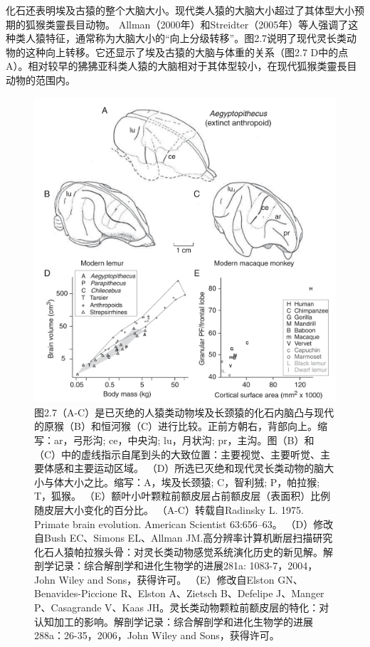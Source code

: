 化石还表明埃及古猿的整个大脑大小。现代类人猿的大脑大小超过了其体型大小预期的狐猴类靈長目动物。 Allman（2000年）和Streidter（2005年）等人强调了这种类人猿特征，通常称为大脑大小的“向上分级转移”。图2.7说明了现代灵长类动物的这种向上转移。它还显示了埃及古猿的大脑与体重的关系（图2.7 D中的点A）。相对较早的狒狒亚科类人猿的大脑相对于其体型较小，在现代狐猴类靈長目动物的范围内。

\begin{figure}[!htb]
	\centering
	\includegraphics[width=0.8\linewidth]{image_pfc/Fig_2_7}
	\caption*{图2.7（A-C）是已灭绝的人猿类动物埃及长颈猿的化石内脑凸与现代的原猴（B）和恒河猴（C）进行比较。正前方朝右，背部向上。缩写：ar，弓形沟; ce，中央沟; lu，月状沟; pr，主沟。图（B）和（C）中的虚线指示自尾到头的大致位置：主要视觉、主要听觉、主要体感和主要运动区域。 （D）所选已灭绝和现代灵长类动物的脑大小与体大小之比。缩写：A，埃及长颈猿; C，智利狨; P，帕拉猴; T，狐猴。 （E）额叶小叶颗粒前额皮层占前额皮层（表面积）比例随皮层大小变化的百分比。 （A-C）转载自Radinsky L. 1975. Primate brain evolution. American Scientist 63:656–63。 （D）修改自Bush EC、Simons EL、Allman JM.高分辨率计算机断层扫描研究化石人猿帕拉猴头骨：对灵长类动物感觉系统演化历史的新见解。解剖学记录：综合解剖学和进化生物学的进展281a: 1083-7，2004，John Wiley and Sons，获得许可。 （E）修改自Elston GN、Benavides-Piccione R、Elston A、Zietsch B、Defelipe J、Manger P、Casagrande V、Kaas JH。灵长类动物颗粒前额皮层的特化：对认知加工的影响。解剖学记录：综合解剖学和进化生物学的进展288a：26-35，2006，John Wiley and Sons，获得许可。}
\end{figure}


